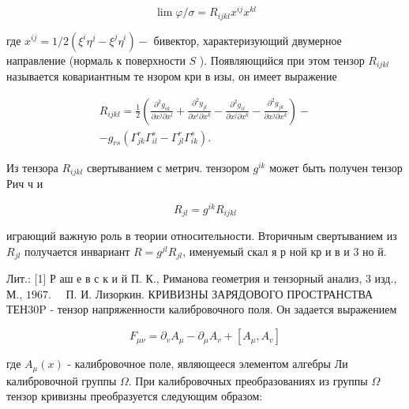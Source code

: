 \documentclass[10pt]{article}
\begin{document}
\[

\lim \varphi / \sigma=R_{i j k l} x^{i j} x^{k l}

\]



где $x^{i j}=1 / 2\left(\xi^{i} \eta^{j}-\xi^{j} \eta^{i}\right)-$ бивектор, характеризующий двумерное направление (нормаль к поверхности $S$ ). Появляющийся при этом тензор $R_{i j k l}$ называется ковариантным те нзором кри в изы, он имеет выражение



\[

\begin{gathered}

R_{i j k l}=\frac{1}{2}\left(\frac{\partial^{2} g_{i k}}{\partial x^{j} \partial x^{l}}+\frac{\partial^{2} g_{j l}}{\partial x^{i} \partial x^{k}}-\frac{\partial^{2} g_{i l}}{\partial x^{j} \partial x^{k}}-\frac{\partial^{2} g_{j k}}{\partial x^{j} \partial x^{k}}\right)- \\

-g_{r s}\left(\Gamma_{j k}^{r} \Gamma_{i l}^{s}-\Gamma_{j l}^{r} \Gamma_{i k}^{s}\right) .

\end{gathered}

\]



Из тензора $R_{i j k l}$ свертыванием с метрич. тензором $g^{i k}$ может быть получен тензор Рич ч и



\[

R_{j l}=g^{i k} R_{i j k l}

\]



играющий важную роль в теории относительности. Вторичным свертыванием из $R_{j l}$ получается инвариант $R=g^{j l} R_{j l}$, именуемый скал я р ной кр и в и 3 но й.



Лит.: [1] Р аш е в с к и й П. К., Риманова геометрия и тензорный анализ, 3 изд., М., $1967 . \quad$ П. И. Лизоркин. КРИВИЗНЫ ЗАРЯДОВОГО ПРОСТРАНСТВА ТЕН30P - тензор напряженности калибровочного поля. Он задается выражением



\[

F_{\mu \nu}=\partial_{v} A_{\mu}-\partial_{\mu} A_{v}+\left[A_{\mu}, A_{v}\right]

\]



где $A_{\mu}(x)$ - калибровочное поле, являющееся элементом алгебры Ли калибровочной группы $\Omega$. При калибровочных преобразованиях из группы $\Omega$ тензор кривизны преобразуется следующим образом:
\end{document}
